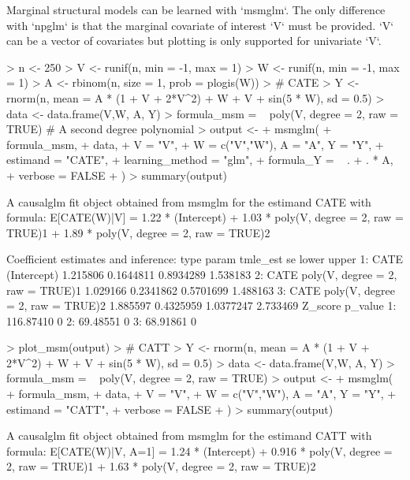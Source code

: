 \documentclass[article]{jss}
\begin{document}
Marginal structural models can be learned with `msmglm`. The only difference with `npglm` is that the marginal covariate of interest `V` must be provided. `V` can be a vector of covariates but plotting is only supported for univariate `V`. 
\begin{Schunk}
\begin{Sinput}
> n <- 250
> V <- runif(n, min = -1, max = 1)
> W <- runif(n, min = -1, max = 1)
> A <- rbinom(n, size = 1, prob = plogis(W))
> # CATE
> Y <- rnorm(n, mean = A * (1 + V + 2*V^2) + W + V + sin(5 * W), sd = 0.5)
> data <- data.frame(V,W, A, Y)
> formula_msm = ~ poly(V, degree = 2, raw = TRUE) # A second degree polynomial
> output <-
+   msmglm(
+     formula_msm,
+     data,
+    V = "V",
+     W = c("V","W"), A = "A", Y = "Y",
+     estimand = "CATE",
+     learning_method = "glm",
+     formula_Y = ~ . + . * A,
+     verbose = FALSE
+   )
> summary(output)
\end{Sinput}
\begin{Soutput}
A causalglm fit object obtained from msmglm for the estimand CATE with formula: 
E[CATE(W)|V] = 1.22 * (Intercept) + 1.03 * poly(V, degree = 2, raw = TRUE)1 + 1.89 * poly(V, degree = 2, raw = TRUE)2

Coefficient estimates and inference:
   type                            param tmle_est        se     lower    upper
1: CATE                      (Intercept) 1.215806 0.1644811 0.8934289 1.538183
2: CATE poly(V, degree = 2, raw = TRUE)1 1.029166 0.2341862 0.5701699 1.488163
3: CATE poly(V, degree = 2, raw = TRUE)2 1.885597 0.4325959 1.0377247 2.733469
     Z_score p_value
1: 116.87410       0
2:  69.48551       0
3:  68.91861       0
\end{Soutput}
\begin{Sinput}
> plot_msm(output)
> # CATT
> Y <- rnorm(n, mean = A * (1 + V + 2*V^2) + W + V + sin(5 * W), sd = 0.5)
> data <- data.frame(V,W, A, Y)
> formula_msm = ~ poly(V, degree = 2, raw = TRUE) 
> output <-
+   msmglm(
+     formula_msm,
+     data,
+     V = "V",
+     W = c("V","W"), A = "A", Y = "Y",
+     estimand = "CATT",
+     verbose = FALSE
+   )
> summary(output)
\end{Sinput}
\begin{Soutput}
A causalglm fit object obtained from msmglm for the estimand CATT with formula: 
E[CATE(W)|V, A=1] = 1.24 * (Intercept) + 0.916 * poly(V, degree = 2, raw = TRUE)1 + 1.63 * poly(V, degree = 2, raw = TRUE)2


\end{Soutput}
\end{Schunk}
\end{document}

